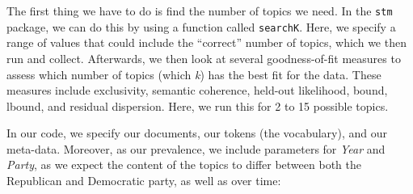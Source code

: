 \documentclass[
]{article}
\newenvironment{Shaded}{\begin{snugshade}}{\end{snugshade}}
\newcommand{\AttributeTok}[1]{\textcolor[rgb]{0.77,0.63,0.00}{#1}}
\newcommand{\ConstantTok}[1]{\textcolor[rgb]{0.00,0.00,0.00}{#1}}
\newcommand{\DecValTok}[1]{\textcolor[rgb]{0.00,0.00,0.81}{#1}}
\newcommand{\FunctionTok}[1]{\textcolor[rgb]{0.00,0.00,0.00}{#1}}
\newcommand{\NormalTok}[1]{#1}
\newcommand{\OtherTok}[1]{\textcolor[rgb]{0.56,0.35,0.01}{#1}}
\newcommand{\SpecialCharTok}[1]{\textcolor[rgb]{0.00,0.00,0.00}{#1}}
\begin{document}
The first thing we have to do is find the number of topics we need. In the \texttt{stm} package, we can do this by using a function called \texttt{searchK}. Here, we specify a range of values that could include the ``correct'' number of topics, which we then run and collect. Afterwards, we then look at several goodness-of-fit measures to assess which number of topics (which \emph{k}) has the best fit for the data. These measures include exclusivity, semantic coherence, held-out likelihood, bound, lbound, and residual dispersion. Here, we run this for 2 to 15 possible topics.

In our code, we specify our documents, our tokens (the vocabulary), and our meta-data. Moreover, as our prevalence, we include parameters for \emph{Year} and \emph{Party}, as we expect the content of the topics to differ between both the Republican and Democratic party, as well as over time:

\begin{Shaded}
\end{Shaded}
\end{document}
